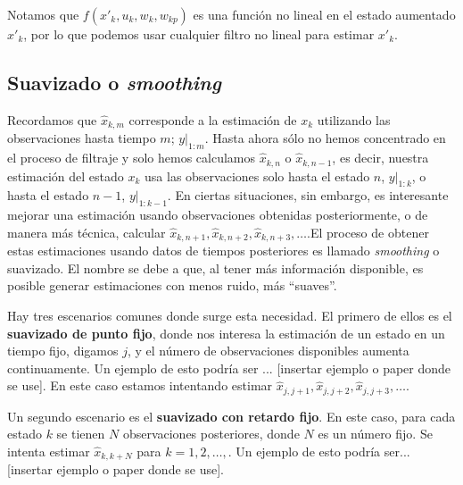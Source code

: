 Notamos que \(f(x'_{k}, u_k, w_k, w_{kp}) \) es una función no lineal en el estado aumentado \(x'_k\), por lo que podemos usar cualquier filtro no lineal para estimar \(x'_k\).\\


\subsection{Suavizado o \textit{smoothing} } \label{smoother}


Recordamos que \(\hat{x}_{k,m}\) corresponde a la estimación de \(x_k\) utilizando las observaciones hasta tiempo \(m\); \(\left. y \right|_{1:m}\). Hasta ahora sólo no hemos concentrado en el proceso de filtraje y solo hemos calculamos \(\hat{x}_{k,n}\) o \(\hat{x}_{k, n-1}\), es decir, nuestra estimación del estado \(x_k\) usa las observaciones solo hasta el estado \(n\), \(\left. y \right|_{1:k}\), o hasta el estado \(n-1\),   \(\left. y \right|_{1:k-1}\). En ciertas situaciones, sin embargo, es interesante mejorar una estimación usando observaciones obtenidas posteriormente, o de manera más técnica, calcular \(\hat{x}_{k, n+1}, \hat{x}_{k, n+2}, \hat{x}_{k, n+3}, \dots\).El proceso de obtener estas estimaciones usando datos de tiempos posteriores es llamado \textit{smoothing} o suavizado. El nombre se debe a que, al tener más información disponible, es posible generar estimaciones con menos ruido, más ``suaves''.

Hay tres escenarios comunes donde surge esta necesidad. El primero de ellos es el \textbf{suavizado de punto fijo}, donde nos interesa la estimación de un estado en un tiempo fijo, digamos \(j\), y el número de observaciones disponibles aumenta continuamente. Un ejemplo de esto podría ser ... [insertar ejemplo o paper donde se use]. En este caso estamos intentando estimar \(\hat{x}_{j, j+1}, \hat{x}_{j, j+2}, \hat{x}_{j, j+3}, \dots\). 

Un segundo escenario es el \textbf{suavizado con retardo fijo}. En este caso, para cada estado \(k\) se tienen \(N\) observaciones posteriores, donde \(N\) es un número fijo. Se intenta estimar \(\hat{x}_{k, k+N}\) para \(k = 1, 2, \dots, \). Un ejemplo de esto podría ser... [insertar ejemplo o paper donde se use]. 

